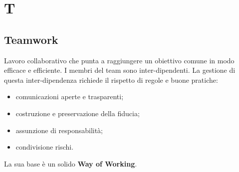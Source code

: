 \section{T}

    \subsection{Teamwork}
    \label{glossario:teamwork}
    Lavoro collaborativo che punta a raggiungere un obiettivo comune in modo efficace e efficiente.
    I membri del team sono inter-dipendenti.
    La gestione di questa inter-dipendenza richiede il rispetto di regole e buone pratiche:
    \begin{itemize}
        \item comunicazioni aperte e trasparenti;
        \item costruzione e preservazione della fiducia;
        \item assunzione di responsabilità;
        \item condivisione rischi.
    \end{itemize}
    La sua base è un solido \textbf{Way of Working}.

\pagebreak